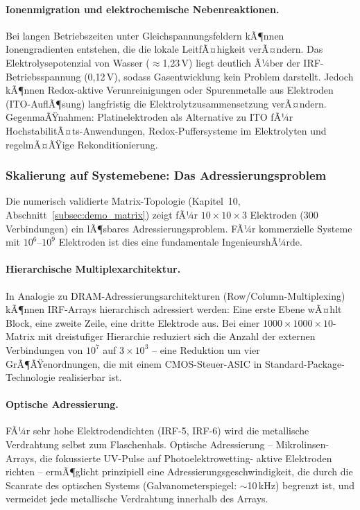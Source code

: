 ﻿\documentclass[a4paper,12pt]{scrreprt}
\theoremstyle{definition}
\begin{document}
\paragraph{Ionenmigration und elektrochemische Nebenreaktionen.}
Bei langen Betriebszeiten unter Gleichspannungsfeldern kÃ¶nnen
Ionengradienten entstehen, die die lokale LeitfÃ¤higkeit verÃ¤ndern.
Das Elektrolysepotenzial von Wasser ($\approx$1,23\,V) liegt
deutlich Ã¼ber der IRF-Betriebsspannung (0,12\,V), sodass
Gasentwicklung kein Problem darstellt. Jedoch kÃ¶nnen Redox-aktive
Verunreinigungen oder Spurenmetalle aus Elektroden (ITO-AuflÃ¶sung)
langfristig die Elektrolytzusammensetzung verÃ¤ndern. GegenmaÃŸnahmen:
Platinelektroden als Alternative zu ITO fÃ¼r HochstabilitÃ¤ts-Anwendungen,
Redox-Puffersysteme im Elektrolyten und regelmÃ¤ÃŸige Rekonditionierung.

\subsubsection{Skalierung auf Systemebene: Das Adressierungsproblem}
\label{subsubsec:adressierung}

Die numerisch validierte Matrix-Topologie (Kapitel~10,
Abschnitt~\ref{subsec:demo_matrix}) zeigt fÃ¼r $10 \times 10 \times 3$
Elektroden (300 Verbindungen) ein lÃ¶sbares Adressierungsproblem.
FÃ¼r kommerzielle Systeme mit $10^6$--$10^9$ Elektroden ist dies
eine fundamentale IngenieurshÃ¼rde.

\paragraph{Hierarchische Multiplexarchitektur.}
In Analogie zu DRAM-Adressierungsarchitekturen (Row/Column-Multiplexing)
kÃ¶nnen IRF-Arrays hierarchisch adressiert werden: Eine erste Ebene
wÃ¤hlt Block, eine zweite Zeile, eine dritte Elektrode aus. Bei
einer $1000 \times 1000 \times 10$-Matrix mit dreistufiger Hierarchie
reduziert sich die Anzahl der externen Verbindungen von $10^7$ auf
$3 \times 10^3$ -- eine Reduktion um vier GrÃ¶ÃŸenordnungen, die mit
einem CMOS-Steuer-ASIC in Standard-Package-Technologie realisierbar ist.

\paragraph{Optische Adressierung.}
FÃ¼r sehr hohe Elektrodendichten (IRF-5, IRF-6) wird die metallische
Verdrahtung selbst zum Flaschenhals. Optische Adressierung --
Mikrolinsen-Arrays, die fokussierte UV-Pulse auf Photoelektrowetting-
aktive Elektroden richten -- ermÃ¶glicht prinzipiell eine
Adressierungsgeschwindigkeit, die durch die Scanrate des optischen
Systems (Galvanometerspiegel: $\sim$10\,kHz) begrenzt ist, und
vermeidet jede metallische Verdrahtung innerhalb des Arrays.
\end{document}
